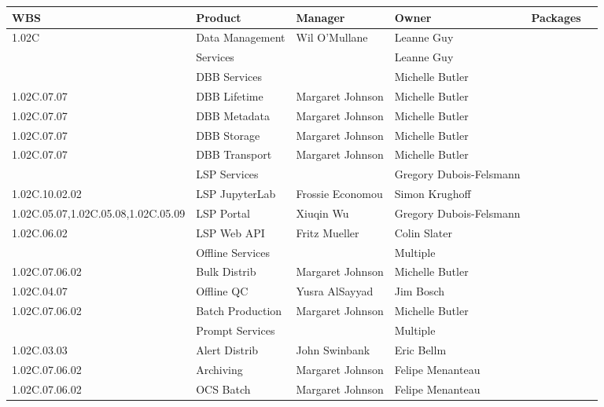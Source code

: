 

\tiny
\begin{longtable}{|p{}|p{}|p{}|p{}|p{}|p{}|}\hline
\textbf{WBS} & Product & Manager & Owner & Packages\\ \hline
1.02C &  Data Management & Wil O'Mullane & Leanne Guy & \\ \hline
 &  Services &  & Leanne Guy & \\ \hline
 &  DBB Services &  & Michelle Butler & \\ \hline
1.02C.07.07 &  DBB Lifetime & Margaret Johnson & Michelle Butler & \\ \hline
1.02C.07.07 &  DBB Metadata & Margaret Johnson & Michelle Butler & \\ \hline
1.02C.07.07 &  DBB Storage & Margaret Johnson & Michelle Butler & \\ \hline
1.02C.07.07 &  DBB Transport & Margaret Johnson & Michelle Butler & \\ \hline
 &  LSP Services &  & Gregory Dubois-Felsmann & \\ \hline
1.02C.10.02.02 &  LSP JupyterLab & Frossie Economou & Simon Krughoff & \\ \hline
1.02C.05.07,1.02C.05.08,1.02C.05.09 &  LSP Portal & Xiuqin Wu & Gregory Dubois-Felsmann & \\ \hline
1.02C.06.02 &  LSP Web API & Fritz Mueller & Colin Slater & \\ \hline
 &  Offline Services &  & Multiple & \\ \hline
1.02C.07.06.02 &  Bulk Distrib & Margaret Johnson & Michelle Butler & \\ \hline
1.02C.04.07 &  Offline QC & Yusra AlSayyad & Jim Bosch & \\ \hline
1.02C.07.06.02 &  Batch Production & Margaret Johnson & Michelle Butler & \\ \hline
 &  Prompt Services &  & Multiple & \\ \hline
1.02C.03.03 &  Alert Distrib & John Swinbank & Eric Bellm & \\ \hline
1.02C.07.06.02 &  Archiving & Margaret Johnson & Felipe Menanteau & \\ \hline
1.02C.07.06.02 &  OCS Batch & Margaret Johnson & Felipe Menanteau & \\ \hline

\end{longtable}
